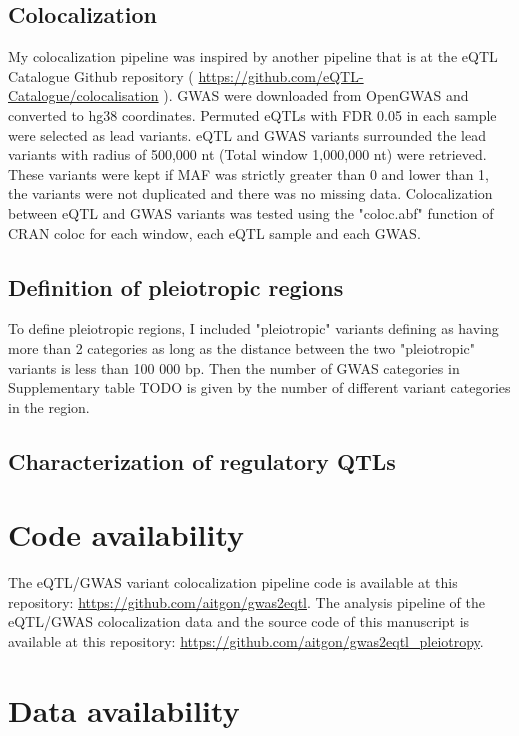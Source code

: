 \subsection*{Colocalization}

My colocalization pipeline was inspired by another pipeline that is at the eQTL Catalogue Github repository ( \url{https://github.com/eQTL-Catalogue/colocalisation} ).
%
GWAS were downloaded from OpenGWAS and converted to hg38 coordinates.
%
Permuted eQTLs with FDR 0.05 in each sample were selected as lead variants.
%
eQTL and GWAS variants surrounded the lead variants with radius of 500,000 nt (Total window 1,000,000 nt) were retrieved.
%
These variants were kept if MAF was strictly greater than 0 and lower than 1, the variants were not duplicated and there was no missing data.
%
Colocalization between eQTL and GWAS variants was tested using the "coloc.abf" function of CRAN coloc for each window, each eQTL sample and each GWAS.

\subsection*{Definition of pleiotropic regions}

To define pleiotropic regions, I included "pleiotropic" variants defining as having more than 2 categories as long as the distance between the two "pleiotropic" variants is less than 100 000 bp.
%
Then the number of GWAS categories in Supplementary table TODO is given by the number of different variant categories in the region.

\subsection*{Characterization of regulatory QTLs}

\section*{Code availability}

The eQTL/GWAS variant colocalization pipeline code is available at this repository: \url{https://github.com/aitgon/gwas2eqtl}.
%
The analysis pipeline of the eQTL/GWAS colocalization data and the source code of this manuscript is available at this repository: \url{https://github.com/aitgon/gwas2eqtl_pleiotropy}.

\section*{Data availability}

